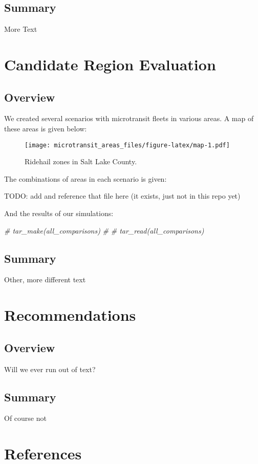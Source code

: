 \documentclass[
]{article}
\newenvironment{Shaded}{\begin{snugshade}}{\end{snugshade}}
\newcommand{\CommentTok}[1]{\textcolor[rgb]{0.56,0.35,0.01}{\textit{#1}}}
\begin{document}
\hypertarget{summary-2}{%
\subsection{Summary}\label{summary-2}}

More Text

\hypertarget{candidate-region-evaluation}{%
\section{Candidate Region Evaluation}\label{candidate-region-evaluation}}

\hypertarget{overview-3}{%
\subsection{Overview}\label{overview-3}}

We created several scenarios with microtransit fleets in various areas. A map of these areas is given below:

\begin{figure}
\centering
\texttt{[image: microtransit\_areas\_files/figure-latex/map-1.pdf]}
\caption{\label{fig:map}Ridehail zones in Salt Lake County.}
\end{figure}

The combinations of areas in each scenario is given:

TODO: add and reference that file here (it exists, just not in this repo yet)

And the results of our simulations:

\begin{Shaded}
\begin{Highlighting}[]
\CommentTok{\# tar\_make(all\_comparisons)}
\CommentTok{\# }
\CommentTok{\# tar\_read(all\_comparisons)}
\end{Highlighting}
\end{Shaded}

\hypertarget{summary-3}{%
\subsection{Summary}\label{summary-3}}

Other, more different text

\hypertarget{recommendations}{%
\section{Recommendations}\label{recommendations}}

\hypertarget{overview-4}{%
\subsection{Overview}\label{overview-4}}

Will we ever run out of text?

\hypertarget{summary-4}{%
\subsection{Summary}\label{summary-4}}

Of course not

\hypertarget{references}{%
\section*{References}\label{references}}
\end{document}
